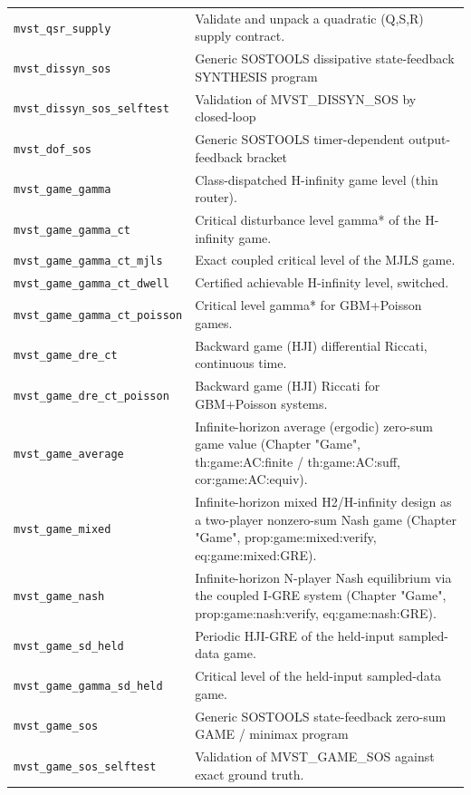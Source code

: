 \documentclass[11pt,oneside]{report}
\newcommand{\code}[1]{\texttt{#1}}
\providecommand{\real}[1]{#1}
\begin{document}
\begin{longtable}[]{@{}
  >{\raggedright\arraybackslash}p{(\columnwidth - 2\tabcolsep) * \real{0.50}}
  >{\raggedright\arraybackslash}p{(\columnwidth - 2\tabcolsep) * \real{0.50}}@{}}
\code{mvst\_qsr\_supply} & Validate and unpack a quadratic (Q,S,R) supply contract. \\
\code{mvst\_dissyn\_sos} & Generic SOSTOOLS dissipative state-feedback SYNTHESIS program \\
\code{mvst\_dissyn\_sos\_selftest} & Validation of MVST\_DISSYN\_SOS by closed-loop \\
\code{mvst\_dof\_sos} & Generic SOSTOOLS timer-dependent output-feedback bracket \\
\code{mvst\_game\_gamma} & Class-dispatched H-infinity game level (thin router). \\
\code{mvst\_game\_gamma\_ct} & Critical disturbance level gamma* of the H-infinity game. \\
\code{mvst\_game\_gamma\_ct\_mjls} & Exact coupled critical level of the MJLS game. \\
\code{mvst\_game\_gamma\_ct\_dwell} & Certified achievable H-infinity level, switched. \\
\code{mvst\_game\_gamma\_ct\_poisson} & Critical level gamma* for GBM+Poisson games. \\
\code{mvst\_game\_dre\_ct} & Backward game (HJI) differential Riccati, continuous time. \\
\code{mvst\_game\_dre\_ct\_poisson} & Backward game (HJI) Riccati for GBM+Poisson systems. \\
\code{mvst\_game\_average} & Infinite-horizon average (ergodic) zero-sum game value (Chapter "Game", th:game:AC:finite / th:game:AC:suff, cor:game:AC:equiv). \\
\code{mvst\_game\_mixed} & Infinite-horizon mixed H2/H-infinity design as a two-player nonzero-sum Nash game (Chapter "Game", prop:game:mixed:verify, eq:game:mixed:GRE). \\
\code{mvst\_game\_nash} & Infinite-horizon N-player Nash equilibrium via the coupled I-GRE system (Chapter "Game", prop:game:nash:verify, eq:game:nash:GRE). \\
\code{mvst\_game\_sd\_held} & Periodic HJI-GRE of the held-input sampled-data game. \\
\code{mvst\_game\_gamma\_sd\_held} & Critical level of the held-input sampled-data game. \\
\code{mvst\_game\_sos} & Generic SOSTOOLS state-feedback zero-sum GAME / minimax program \\
\code{mvst\_game\_sos\_selftest} & Validation of MVST\_GAME\_SOS against exact ground truth. \\
\bottomrule
\end{longtable}
\end{document}
